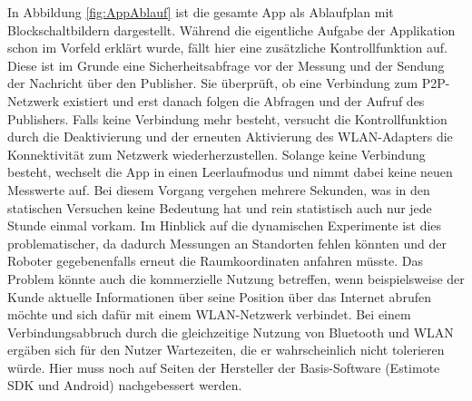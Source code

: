 In Abbildung \ref{fig:AppAblauf} ist die gesamte App als Ablaufplan mit Blockschaltbildern dargestellt. Während die eigentliche Aufgabe der Applikation schon im Vorfeld erklärt wurde, fällt hier eine zusätzliche Kontrollfunktion auf. Diese ist im Grunde eine Sicherheitsabfrage vor der Messung und der Sendung der Nachricht über den Publisher. Sie überprüft, ob eine Verbindung zum P2P-Netzwerk existiert und erst danach folgen die Abfragen und der Aufruf des Publishers. Falls keine Verbindung mehr besteht, versucht die Kontrollfunktion durch die Deaktivierung und der erneuten Aktivierung des WLAN-Adapters die Konnektivität zum Netzwerk wiederherzustellen. Solange keine Verbindung besteht, wechselt die App in einen Leerlaufmodus und nimmt dabei keine neuen Messwerte auf. Bei diesem Vorgang vergehen mehrere Sekunden, was in den statischen Versuchen keine Bedeutung hat und rein statistisch auch nur jede Stunde einmal vorkam. Im Hinblick auf die dynamischen Experimente ist dies problematischer, da dadurch Messungen an Standorten fehlen könnten und der Roboter gegebenenfalls erneut die Raumkoordinaten anfahren müsste. Das Problem könnte auch die kommerzielle Nutzung betreffen, wenn beispielsweise der Kunde aktuelle Informationen über seine Position über das Internet abrufen möchte und sich dafür mit einem WLAN-Netzwerk verbindet. Bei einem Verbindungsabbruch durch die gleichzeitige Nutzung von Bluetooth und WLAN ergäben sich für den Nutzer Wartezeiten, die er wahrscheinlich nicht tolerieren würde. Hier muss noch auf Seiten der Hersteller der Basis-Software (Estimote SDK und Android) nachgebessert werden. 
